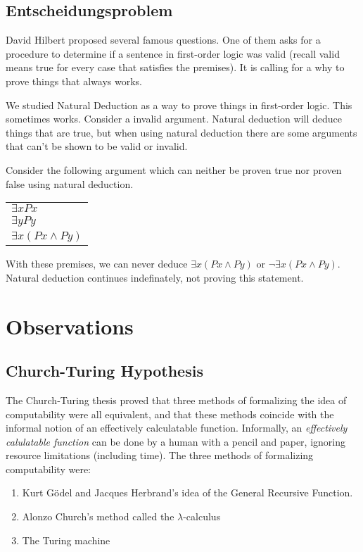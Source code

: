 \documentclass[11pt, letterpaper, twoside, openright]{book}
\begin{document}

\subsection{Entscheidungsproblem}
David Hilbert proposed several famous questions. One of them asks for a procedure to determine if a sentence in first-order logic was valid (recall valid means true for every case that satisfies the premises). It is calling for a why to prove things that always works.

We studied Natural Deduction as a way to prove things in first-order logic. This sometimes works. Consider a invalid argument. Natural deduction will deduce things that are true, but when using natural deduction there are some arguments that can't be shown to be valid or invalid.

Consider the following argument which can neither be proven true nor proven false using natural deduction.

\begin{tabular}{l}
$\exists x Px$ \\
$\exists y Py$ \\
\hline
$\exists x (Px \wedge Py) $ \\
\end{tabular}

With these premises, we can never deduce $\exists x (Px \wedge Py) $ or $\neg \exists x (Px \wedge Py) $. Natural deduction continues indefinately, not proving this statement.

\section{Observations}
\subsection{Church-Turing Hypothesis}
The Church-Turing thesis proved that three methods of formalizing the idea of computability were all equivalent, and that these methods coincide with the informal notion of an effectively calculatable function. Informally, an \emph{effectively calulatable function} can be done by a human with a pencil and paper, ignoring resource limitations (including time). The three methods of formalizing computability were:

\begin{enumerate}
\item Kurt G\"{o}del and Jacques Herbrand's idea of the General Recursive Function.
\item Alonzo Church's method called the $\lambda$-calculus
\item The Turing machine
\end{enumerate}
\end{document}
